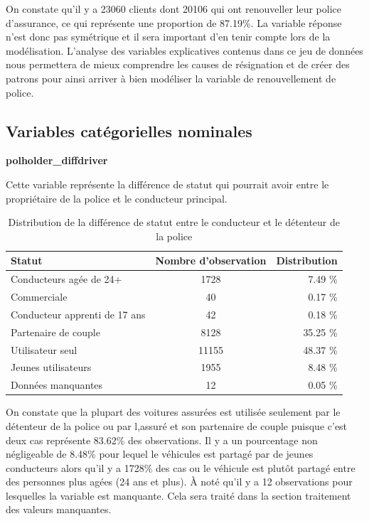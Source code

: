 \documentclass[
]{article}
\begin{document}
On constate qu'il y a 23060 clients dont 20106 qui ont renouveller leur
police d'assurance, ce qui représente une proportion de 87.19\%. La
variable réponse n'est donc pas symétrique et il sera important d'en
tenir compte lors de la modélisation. L'analyse des variables
explicatives contenus dans ce jeu de données nous permettera de mieux
comprendre les causes de résignation et de créer des patrons pour ainsi
arriver à bien modéliser la variable de renouvellement de police.

\hypertarget{variables-catuxe9gorielles-nominales}{%
\subsection{Variables catégorielles
nominales}\label{variables-catuxe9gorielles-nominales}}

\textbf{polholder\_diffdriver}

Cette variable représente la différence de statut qui pourrait avoir
entre le propriétaire de la police et le conducteur principal.

\begin{table}[ht]
\centering
\caption{Distribution de la différence de statut entre le conducteur et le détenteur de la police} 
\label{tbl:statutdiff}
\begin{tabular}{lcr}
  \hline
Statut & Nombre d'observation & Distribution \\ 
  \hline
Conducteurs agée de 24+ & 1728 & 7.49 \% \\ 
  Commerciale & 40 & 0.17 \% \\ 
  Conducteur apprenti de 17 ans & 42 & 0.18 \% \\ 
  Partenaire de couple & 8128 & 35.25 \% \\ 
  Utilisateur seul & 11155 & 48.37 \% \\ 
  Jeunes utilisateurs & 1955 & 8.48 \% \\ 
  Données manquantes & 12 & 0.05 \% \\ 
   \hline
\end{tabular}
\end{table}

On constate que la plupart des voitures assurées est utilisée seulement
par le détenteur de la police ou par l,assuré et son partenaire de
couple puisque c'est deux cas représente 83.62\% des observations. Il y
a un pourcentage non négligeable de 8.48\% pour lequel le véhicules est
partagé par de jeunes conducteurs alors qu'il y a 1728\% des cas ou le
véhicule est plutôt partagé entre des personnes plus agées (24 ans et
plus). À noté qu'il y a 12 observations pour lesquelles la variable est
manquante. Cela sera traité dans la section traitement des valeurs
manquantes.
\end{document}
